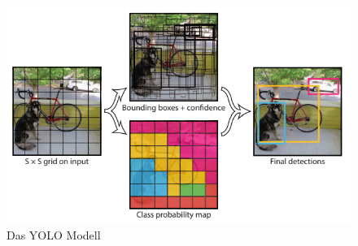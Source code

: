 {{	\begin{figure}[ht]
		\centering
		\includegraphics*[scale = 2, keepaspectratio, trim=2 2 2 2 ]{images/YOLO/YOLO_model.png}
		\caption[Das YOLO Modell]{Das YOLO Modell\citep{Redmon2016}}
		\label{YOLO_Model}
 	\end{figure}

}}
